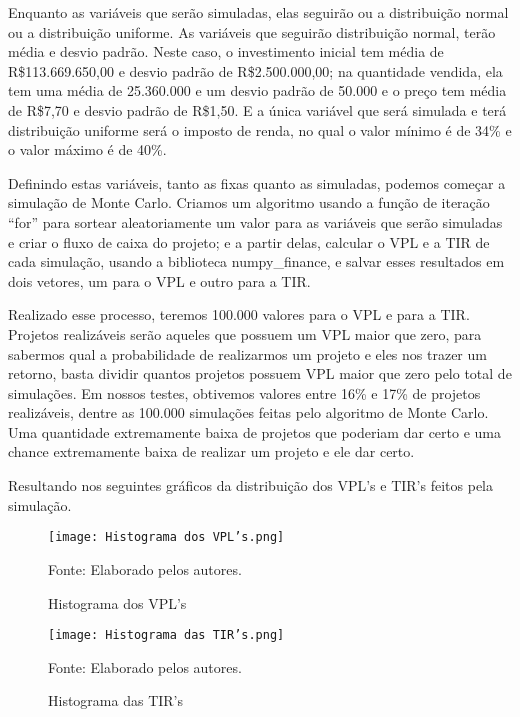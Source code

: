 \documentclass[11pt]{article}
\begin{document}
Enquanto as variáveis que serão simuladas, elas seguirão ou a distribuição normal ou a distribuição uniforme. As variáveis que seguirão distribuição normal, terão média e desvio padrão. Neste caso, o investimento inicial tem média de R\$113.669.650,00 e desvio padrão de R\$2.500.000,00; na quantidade vendida, ela tem uma média de 25.360.000 e um desvio padrão de 50.000 e o preço tem média de R\$7,70 e desvio padrão de R\$1,50. E a única variável que será simulada e terá distribuição uniforme será o imposto de renda, no qual o valor mínimo é de 34\% e o valor máximo é de 40\%.

Definindo estas variáveis, tanto as fixas quanto as simuladas, podemos começar a simulação de Monte Carlo. Criamos um algoritmo usando a função de iteração “for” para sortear aleatoriamente um valor para as variáveis que serão simuladas e criar o fluxo de caixa do projeto; e a partir delas, calcular o VPL e a TIR de cada simulação, usando a biblioteca numpy\_finance, e salvar esses resultados em dois vetores, um para o VPL e outro para a TIR.

Realizado esse processo, teremos 100.000 valores para o VPL e para a TIR. Projetos realizáveis serão aqueles que possuem um VPL maior que zero, para sabermos qual a probabilidade de realizarmos um projeto e eles nos trazer um retorno, basta dividir quantos projetos possuem VPL maior que zero pelo total de simulações. Em nossos testes, obtivemos valores entre 16\% e 17\% de projetos realizáveis, dentre as 100.000 simulações feitas pelo algoritmo de Monte Carlo. Uma quantidade extremamente baixa de projetos que poderiam dar certo e uma chance extremamente baixa de realizar um projeto e ele dar certo.

Resultando nos seguintes gráficos da distribuição dos VPL’s e TIR’s feitos pela simulação.

\begin{figure}[H]
\centering
\caption{Histograma dos VPL's}
\texttt{[image: Histograma dos VPL's.png]}
\label{fig:my_label}

\footnotesize{Fonte: Elaborado pelos autores.}
\end{figure}

\begin{figure}[H]
\centering
\caption{Histograma das TIR's}
\texttt{[image: Histograma das TIR's.png]}
\label{fig:my_label}

\footnotesize{Fonte: Elaborado pelos autores.}
\end{figure}
\end{document}
